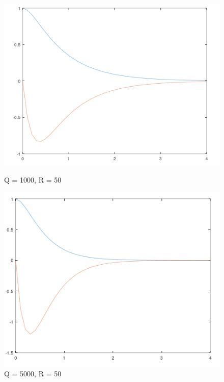 \documentclass{jsarticle}
\begin{document}
\begin{figure}[h!]
  \centering
  \begin{minipage}{0.325\linewidth}
    \centering
    \includegraphics[width=\linewidth]{./fig/q1000_r50.png}
    \caption{Q = 1000, R = 50}
  \end{minipage}
  \hfill
  \begin{minipage}{0.325\linewidth}
    \centering
    \includegraphics[width=\linewidth]{./fig/q5000_r50.png}
    \caption{Q = 5000, R = 50}
  \end{minipage}
  \hfill
  \begin{minipage}{0.325\linewidth}
    \centering

\end{minipage}
\end{figure}
\end{document}
